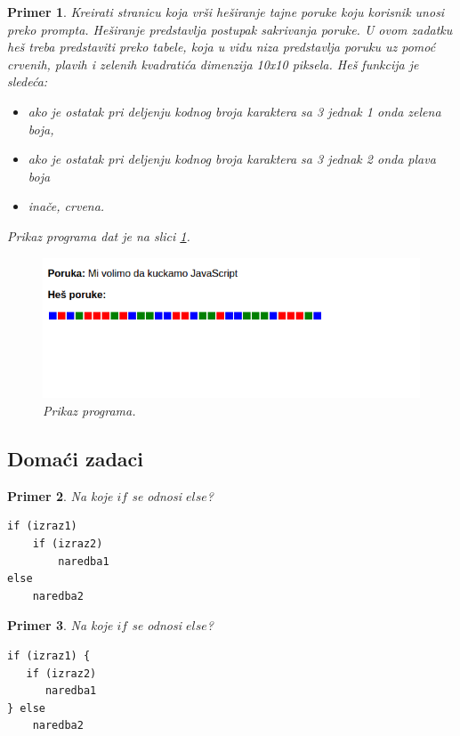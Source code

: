 \documentclass[a4paper]{article}
\newtheorem{primer}{Primer}[section]
\begin{document}
\begin{primer}
Kreirati stranicu koja vrši heširanje tajne poruke koju korisnik unosi preko prompta. Heširanje predstavlja postupak sakrivanja poruke. U ovom zadatku heš treba predstaviti preko tabele, koja u vidu niza predstavlja poruku uz pomoć crvenih, plavih i zelenih kvadratića dimenzija 10x10 piksela. Heš funkcija je sledeća:
\begin{itemize}
\item ako je ostatak pri deljenju kodnog broja karaktera sa 3 jednak 1 onda zelena boja,
\item ako je ostatak pri deljenju kodnog broja karaktera sa 3 jednak 2 onda plava boja
\item inače, crvena. 
\end{itemize}
Prikaz programa dat je na slici \ref{fig:hes}.
\begin{figure}[h!]
\begin{center}
\includegraphics[scale=0.5]{pictures/hes.png}
\end{center}
\caption{Prikaz programa.}
\label{fig:hes}
\end{figure}

\end{primer}


\subsection{Domaći zadaci}
\begin{primer}
Na koje $if$ se odnosi $else$?
\begin{verbatim}
if (izraz1)
    if (izraz2)
        naredba1
else
    naredba2
\end{verbatim}
\end{primer}
\begin{primer}
Na koje $if$ se odnosi $else$?
\begin{verbatim}
if (izraz1) {
   if (izraz2)
      naredba1
} else
    naredba2
\end{verbatim}
\end{primer}
\end{document}
